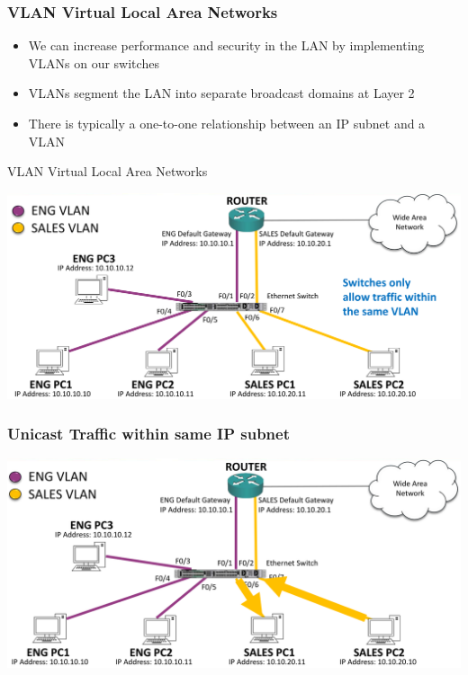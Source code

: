 \documentclass[pdflatex,compress,mathserif]{beamer}
\begin{document}
\begin{frame}
	\frametitle{VLAN Virtual Local Area Networks}
	\begin{itemize}
		\item We can increase performance and security in the LAN by implementing
VLANs on our switches
		\item VLANs segment the LAN into separate broadcast domains at Layer 2
		\item There is typically a one-to-one relationship between an IP subnet and
a VLAN
	\end{itemize}
\end{frame}

\begin{frame}{VLAN Virtual Local Area Networks}
	\begin{center}
		\includegraphics[width=\linewidth]{img/img14}
	\end{center}
\end{frame}

\begin{frame}
	\frametitle{Unicast Traffic within same IP subnet}
	\begin{center}
		\includegraphics[width=\linewidth]{img/img15}
	\end{center}
\end{frame}
\end{document}
